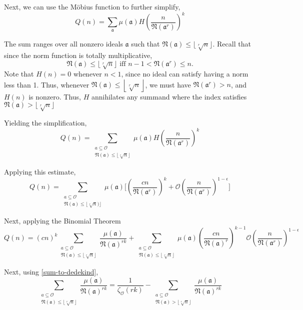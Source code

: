 \documentclass[10pt,a4paper]{article}
\theoremstyle{definition}
\theoremstyle{remark}
\newcommand{\f}[1]{\mathfrak{#1}}
\begin{document}
	Next, we can use the M\"obius function to further simplify,
	\begin{equation}
		Q(n)=\sum_{\f{a}}\mu(\f{a})H\left(\frac{n}{\f{N}(\f{a}^r)}\right)^k
	\end{equation}

	The sum ranges over all nonzero ideals \(\f{a}\) such that \(\f{N}(\f{a})\leq \lfloor \sqrt[r]{n} \rfloor \).
	Recall that since the norm function is totally multiplicative, 
	$$\f{N}(\f{a}) \leq \lfloor \sqrt[r]{n} \rfloor \text{ iff }
		n-1 < \f{N}(\f{a}^r) \leq n.$$
	Note that \(H(n)=0\) whenever \(n<1\), since no ideal can satisfy having a norm less than 1. Thus, whenever \(\f{N}(\f{a}) \leq \left\lfloor\sqrt[r]{n}\right\rfloor\), we must have \(\f{N}(\f{a}^r)> n \), and \(H(n)\) is nonzero. Thus, \(H\) annihilates any summand where the index satisfies \( \f{N}(\f{a})> \lfloor\sqrt[r]{n}\rfloor \)

	Yielding the simplification,
	\begin{equation}
		Q(n)=\sum_{\substack{a\subseteq \mathcal{O}\\ 
				\f{N}(\f{a}) \leq \lfloor \sqrt[r]{n} \rfloor}} \mu(\f{a})H\left(\frac{n}{\f{N}(\f{a}^r)}\right)^k
	\end{equation}
	
	Applying this estimate,
	\begin{equation}
	Q(n)=\sum_{\substack{a\subseteq \mathcal{O}\\ 
			\f{N}(\f{a}) \leq \lfloor \sqrt[r]{n}) \rfloor}} \mu(\f{a})\Biggl[\left(\frac{cn}{\f{N}(\f{a}^r)}\right)^k+\mathcal{O}\left(\frac{n}{\f{N}(\f{a}^r)}\right)^{1-\epsilon}\Biggl]
	\end{equation}

	Next, applying the Binomial Theorem
	\begin{equation}
		Q(n)=(cn)^k\sum_{\substack{a\subseteq \mathcal{O}\\ 
				\f{N}(\f{a}) \leq \lfloor \sqrt[r]{n} \rfloor}}\frac{\mu(\f{a})}{\f{N}(\f{a})^{rk}}+\sum_{\substack{a\subseteq \mathcal{O}\\ 
				\f{N}(\f{a}) \leq \lfloor \sqrt[r]{n} \rfloor}}\mu(\f{a})\left(\frac{cn}{\f{N}(\f{a})^{r}}\right)^{k-1}\mathcal{O}\left(\frac{n}{\f{N}(\f{a}^r)}\right)^{1-\epsilon}
	\end{equation}

	Next, using \cref{sum-to-dedekind}, 
	\begin{equation}
		\sum_{\substack{a\subseteq \mathcal{O}\\ 
				\f{N}(\f{a}) \leq \lfloor\sqrt[r]{n}\rfloor}} \frac{\mu(\f{a})}{\f{N}(\f{a})^{rk}}=\frac{1}{\zeta_{\mathcal{O}}(rk)} - \sum_{\substack{a\subseteq \mathcal{O}\\  				\f{N}(\f{a}) >\lfloor\sqrt[r]{n}\rfloor}}\frac{\mu(\f{a})}{\f{N}(\f{a})^{rk}}
	\end{equation}
	
\end{document}
